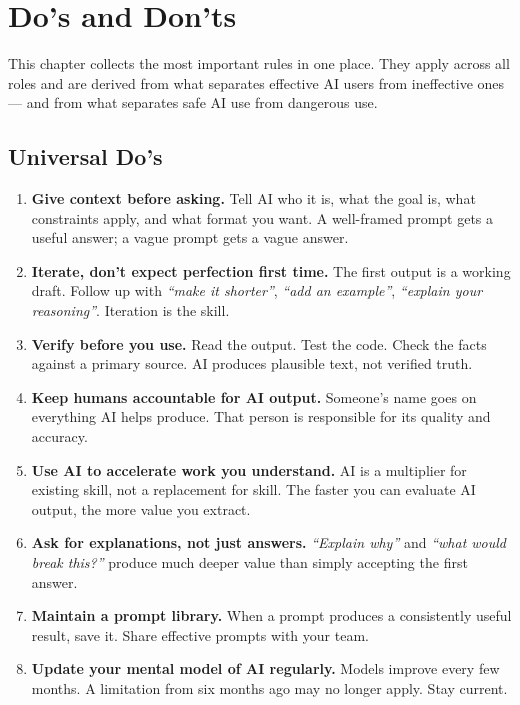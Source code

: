 \chapter{Do's and Don'ts}
\label{ch:dosdonts}

This chapter collects the most important rules in one place.
They apply across all roles and are derived from what separates effective AI users
from ineffective ones --- and from what separates safe AI use from dangerous use.

\section{Universal Do's}
\label{sec:dos}

\begin{enumerate}

  \item \textbf{Give context before asking.}
    Tell AI who it is, what the goal is, what constraints apply, and what format you
    want. A well-framed prompt gets a useful answer; a vague prompt gets a vague
    answer.

  \item \textbf{Iterate, don't expect perfection first time.}
    The first output is a working draft. Follow up with \textit{``make it shorter''},
    \textit{``add an example''}, \textit{``explain your reasoning''}.
    Iteration is the skill.

  \item \textbf{Verify before you use.}
    Read the output. Test the code. Check the facts against a primary source.
    AI produces plausible text, not verified truth.

  \item \textbf{Keep humans accountable for AI output.}
    Someone's name goes on everything AI helps produce. That person is responsible for
    its quality and accuracy.

  \item \textbf{Use AI to accelerate work you understand.}
    AI is a multiplier for existing skill, not a replacement for skill.
    The faster you can evaluate AI output, the more value you extract.

  \item \textbf{Ask for explanations, not just answers.}
    \textit{``Explain why''} and \textit{``what would break this?''} produce
    much deeper value than simply accepting the first answer.

  \item \textbf{Maintain a prompt library.}
    When a prompt produces a consistently useful result, save it.
    Share effective prompts with your team.

  \item \textbf{Update your mental model of AI regularly.}
    Models improve every few months. A limitation from six months ago may no longer
    apply. Stay current.

\end{enumerate}

